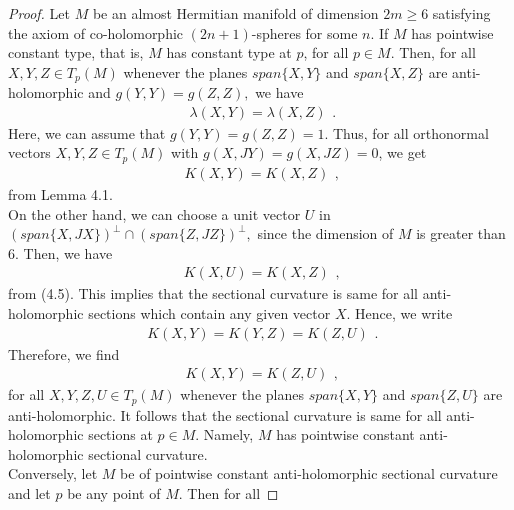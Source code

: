 \documentclass{amsart}
\newtheorem*{theorem A}{Theorem A}
\newtheorem*{theorem B}{N\"olker's Theorem}
\theoremstyle{remark}
\theoremstyle{remark}
\theoremstyle{definition}
\numberwithin{equation}{section}
\begin{document}
\begin{proof}
Let $M$ be an  almost Hermitian manifold of dimension $2m\geq6$
satisfying the axiom of co-holomorphic $(2n+1)$-spheres for some
$n$. If $M$ has pointwise constant type, that is, $M$ has constant
type at $p$, for all $p\in M$. Then, for all $X,Y,Z\in T_{p}(M)$
whenever the planes $span\{X,Y\}$ and $span\{X,Z\}$ are
anti-holomorphic and $g(Y,Y)=g(Z,Z),$ we have
\begin{equation}
\label{e1}
\begin{array}{c}
\lambda(X,Y)=\lambda(X,Z)
\end{array}.
\end{equation}
Here, we can assume that $g(Y,Y)=g(Z,Z)=1.$ Thus, for all
orthonormal vectors $X,Y,Z\in T_{p}(M)$ with $g(X,JY)=g(X,JZ)=0$, we
get
\begin{equation}
\label{e1}
\begin{array}{c}
K(X,Y)=K(X,Z)
\end{array},
\end{equation}
from Lemma 4.1.\\
On the other hand, we can choose a unit vector $U$ in
$(span\{X,JX\})^{\bot}\cap(span\{Z,JZ\})^{\bot},$  since the
dimension of $M$ is greater than 6. Then, we have
\begin{equation}
\label{e1}
\begin{array}{c}
K(X,U)=K(X,Z)
\end{array},
\end{equation}
from (4.5). This implies that the sectional curvature is same for
all anti-holomorphic sections which contain any given vector $X.$
Hence, we write
\begin{equation}
\label{e1}
\begin{array}{c}
K(X,Y)=K(Y,Z)=K(Z,U)
\end{array}.
\end{equation}
Therefore, we find
\begin{equation}
\label{e1}
\begin{array}{c}
K(X,Y)=K(Z,U)
\end{array},
\end{equation}
for all $X,Y,Z,U\in T_{p}(M)$ whenever the planes $span\{X,Y\}$ and
$span\{Z,U\}$ are anti-holomorphic. It follows that the sectional
curvature is same for all anti-holomorphic sections at $p\in M.$
Namely, $M$ has pointwise constant
anti-holomorphic sectional curvature.\\
Conversely, let $M$ be of pointwise constant anti-holomorphic
sectional curvature and let $p$ be any point of $M$. Then for all

\end{proof}
\end{document}
